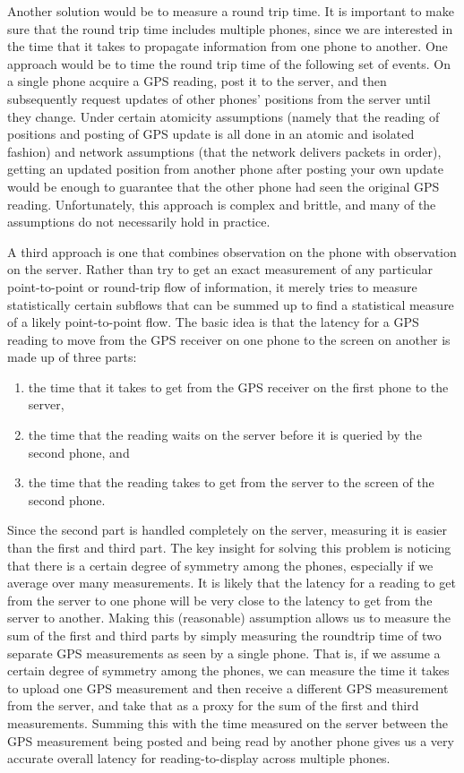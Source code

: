 \documentclass{acm_proc_article-sp}
\begin{document}
Another solution would be to measure a round trip time.  It is
important to make sure that the round trip time includes multiple
phones, since we are interested in the time that it takes to propagate
information from one phone to another.  One approach would be to time
the round trip time of the following set of events.  On a single phone
acquire a GPS reading, post it to the server, and then subsequently
request updates of other phones' positions from the server until they
change.  Under certain atomicity assumptions (namely that the reading
of positions and posting of GPS update is all done in an atomic and
isolated fashion) and network assumptions (that the network delivers
packets in order), getting an updated position from another phone
after posting your own update would be enough to guarantee that the
other phone had seen the original GPS reading.  Unfortunately, this
approach is complex and brittle, and many of the assumptions do not
necessarily hold in practice.

A third approach is one that combines observation on the phone with
observation on the server.  Rather than try to get an exact
measurement of any particular point-to-point or round-trip flow of
information, it merely tries to measure statistically certain subflows
that can be summed up to find a statistical measure of a likely
point-to-point flow.  The basic idea is that the latency for a GPS
reading to move from the GPS receiver on one phone to the screen on
another is made up of three parts:

\begin{enumerate}
\item the time that it takes to get from the GPS receiver on the first phone to the server,
\item the time that the reading waits on the server before it is queried by the second phone, and
\item the time that the reading takes to get from the server to the screen of the second phone.
\end{enumerate}

Since the second part is handled completely on the server, measuring
it is easier than the first and third part.  The key insight for
solving this problem is noticing that there is a certain degree of
symmetry among the phones, especially if we average over many
measurements.  It is likely that the latency for a reading to get from
the server to one phone will be very close to the latency to get from
the server to another.  Making this (reasonable) assumption allows us
to measure the sum of the first and third parts by simply measuring
the roundtrip time of two separate GPS measurements as seen by a
single phone.  That is, if we assume a certain degree of symmetry
among the phones, we can measure the time it takes to upload one GPS
measurement and then receive a different GPS measurement from the
server, and take that as a proxy for the sum of the first and third
measurements.  Summing this with the time measured on the server
between the GPS measurement being posted and being read by another
phone gives us a very accurate overall latency for reading-to-display
across multiple phones.
\end{document}
